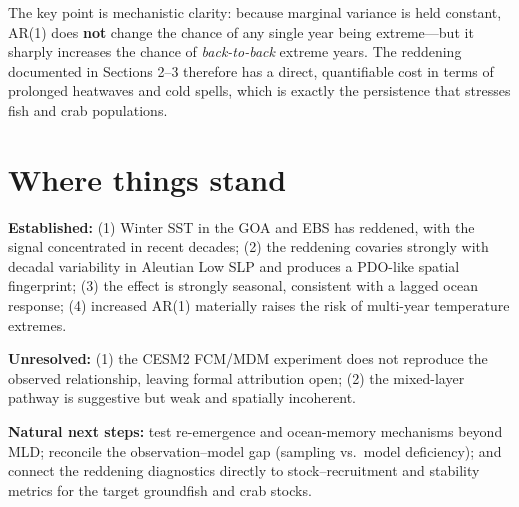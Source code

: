 \documentclass[11pt]{article}
\begin{document}
The key point is mechanistic clarity: because marginal variance is held constant, AR(1) does
\textbf{not} change the chance of any single year being extreme---but it sharply increases the chance
of \textit{back-to-back} extreme years. The reddening documented in Sections 2--3 therefore has a
direct, quantifiable cost in terms of prolonged heatwaves and cold spells, which is exactly the
persistence that stresses fish and crab populations.

\section{Where things stand}

\textbf{Established:} (1) Winter SST in the GOA and EBS has reddened, with the signal concentrated in
recent decades; (2) the reddening covaries strongly with decadal variability in Aleutian Low SLP and
produces a PDO-like spatial fingerprint; (3) the effect is strongly seasonal, consistent with a
lagged ocean response; (4) increased AR(1) materially raises the risk of multi-year temperature
extremes.

\textbf{Unresolved:} (1) the CESM2 FCM/MDM experiment does not reproduce the observed relationship,
leaving formal attribution open; (2) the mixed-layer pathway is suggestive but weak and spatially
incoherent.

\textbf{Natural next steps:} test re-emergence and ocean-memory mechanisms beyond MLD; reconcile the
observation--model gap (sampling vs.\ model deficiency); and connect the reddening diagnostics
directly to stock--recruitment and stability metrics for the target groundfish and crab stocks.
\end{document}
